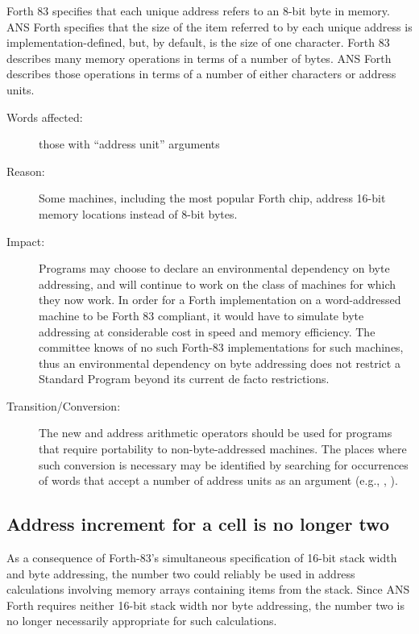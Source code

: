 Forth 83 specifies that each unique address refers to an 8-bit byte
in memory. ANS Forth specifies that the size of the item referred to
by each unique address is implementation-defined, but, by default,
is the size of one character. Forth 83 describes many memory
operations in terms of a number of bytes. ANS Forth describes those
operations in terms of a number of either characters or address
units.

\begin{description}
\item[Words affected:]
	those with ``address unit'' arguments

\item[Reason:]
	Some machines, including the most popular Forth chip, address
	16-bit memory locations instead of 8-bit bytes.

\item[Impact:]
	Programs may choose to declare an environmental dependency on
	byte addressing, and will continue to work on the class of
	machines for which they now work. In order for a Forth
	implementation on a word-addressed machine to be Forth 83
	compliant, it would have to simulate byte addressing at
	considerable cost in speed and memory efficiency. The committee
	knows of no such Forth-83 implementations for such machines,
	thus an environmental dependency on byte addressing does not
	restrict a Standard Program beyond its current de facto
	restrictions.

\item[Transition/Conversion:]
	The new  and  address arithmetic operators
	should be used for programs that require portability to
	non-byte-addressed machines. The places where such conversion is
	necessary may be identified by searching for occurrences of words
	that accept a number of address units as an argument (e.g.,
	, ).
\end{description}

\subsection{Address increment for a cell is no longer two} %

As a consequence of Forth-83's simultaneous specification of 16-bit
stack width and byte addressing, the number two could reliably be used
in address calculations involving memory arrays containing items from
the stack. Since ANS Forth requires neither 16-bit stack width nor
byte addressing, the number two is no longer necessarily appropriate
for such calculations.

